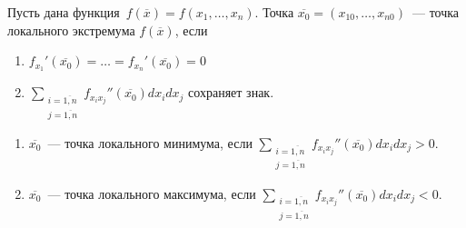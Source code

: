 \begin{theorem}
\label{th:sufficient_condition_of_local_extremum}
	Пусть дана функция~$f(\overline x) = f(x_1, \ldots, x_n)$.
	Точка $\overline{x_0} = (x_{10}, \ldots, x_{n0})$~--- точка локального экстремума $f(\overline x)$, если
\begin{enumerate}
	\item $\displaystyle f_{x_1}'(\overline{x_0}) = \ldots = f_{x_n}'(\overline{x_0}) = 0$
	\item $\displaystyle \sum_{
\begin{smallmatrix}
	i = \overline{1, n} \\
	j = \overline{1, n}
\end{smallmatrix}
	} f_{x_i x_j}''(\overline{x_0}) dx_i dx_j$ сохраняет знак.
\end{enumerate}

\begin{enumerate}
	\item $\overline{x_0}$~--- точка локального минимума, если $\displaystyle \sum_{
\begin{smallmatrix}
	i = \overline{1, n} \\
	j = \overline{1, n}
\end{smallmatrix}
	} f_{x_i x_j}''(\overline{x_0}) dx_i dx_j > 0$.
	\item $\overline{x_0}$~--- точка локального максимума, если $\displaystyle \sum_{
\begin{smallmatrix}
	i = \overline{1, n} \\
	j = \overline{1, n}
\end{smallmatrix}
	} f_{x_i x_j}''(\overline{x_0}) dx_i dx_j < 0$.
\end{enumerate}
\end{theorem}
